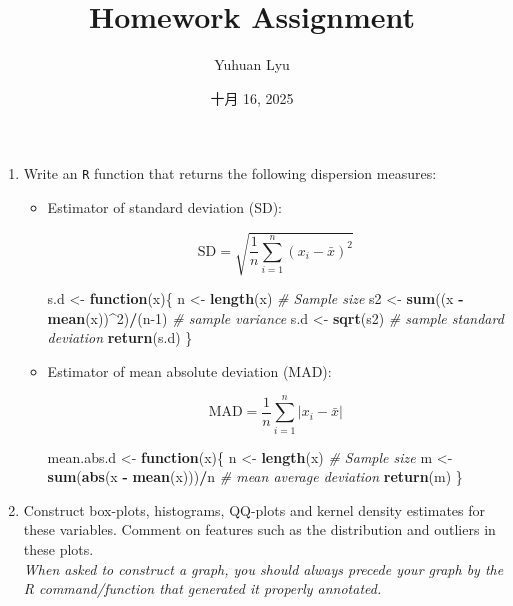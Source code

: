 \documentclass[
]{article}
\title{Homework Assignment}
\author{Yuhuan Lyu}
\date{十月 16, 2025}
\newenvironment{Shaded}{\begin{snugshade}}{\end{snugshade}}
\newcommand{\CommentTok}[1]{\textcolor[rgb]{0.56,0.35,0.01}{\textit{#1}}}
\newcommand{\ControlFlowTok}[1]{\textcolor[rgb]{0.13,0.29,0.53}{\textbf{#1}}}
\newcommand{\DecValTok}[1]{\textcolor[rgb]{0.00,0.00,0.81}{#1}}
\newcommand{\FunctionTok}[1]{\textcolor[rgb]{0.13,0.29,0.53}{\textbf{#1}}}
\newcommand{\NormalTok}[1]{#1}
\newcommand{\OtherTok}[1]{\textcolor[rgb]{0.56,0.35,0.01}{#1}}
\newcommand{\SpecialCharTok}[1]{\textcolor[rgb]{0.81,0.36,0.00}{\textbf{#1}}}
\begin{document}
\maketitle

\begin{enumerate}
\def\labelenumi{\arabic{enumi}.}
\item
  Write an \texttt{R} function that returns the following dispersion
  measures:

  \begin{itemize}
  \item
    Estimator of standard deviation (SD):

    \[\text{SD} = \sqrt{\frac{1}{n}\sum_{i=1}^{n}(x_{i} - \bar{x})^2}\]

\begin{Shaded}
\begin{Highlighting}[]
\NormalTok{s.d }\OtherTok{\textless{}{-}} \ControlFlowTok{function}\NormalTok{(x)\{}
\NormalTok{    n }\OtherTok{\textless{}{-}} \FunctionTok{length}\NormalTok{(x) }\CommentTok{\# Sample size}
\NormalTok{    s2 }\OtherTok{\textless{}{-}} \FunctionTok{sum}\NormalTok{((x }\SpecialCharTok{{-}} \FunctionTok{mean}\NormalTok{(x))}\SpecialCharTok{\^{}}\DecValTok{2}\NormalTok{)}\SpecialCharTok{/}\NormalTok{(n}\DecValTok{{-}1}\NormalTok{) }\CommentTok{\# sample variance}
\NormalTok{    s.d }\OtherTok{\textless{}{-}} \FunctionTok{sqrt}\NormalTok{(s2) }\CommentTok{\# sample standard deviation }
    \FunctionTok{return}\NormalTok{(s.d)}
\NormalTok{\}}
\end{Highlighting}
\end{Shaded}
  \item
    Estimator of mean absolute deviation (MAD):

    \[\text{MAD} = \frac{1}{n}\sum_{i=1}^{n}|x_{i} - \bar{x}|\]

\begin{Shaded}
\begin{Highlighting}[]
\NormalTok{mean.abs.d }\OtherTok{\textless{}{-}} \ControlFlowTok{function}\NormalTok{(x)\{}
\NormalTok{    n }\OtherTok{\textless{}{-}} \FunctionTok{length}\NormalTok{(x) }\CommentTok{\# Sample size}
\NormalTok{    m }\OtherTok{\textless{}{-}} \FunctionTok{sum}\NormalTok{(}\FunctionTok{abs}\NormalTok{(x }\SpecialCharTok{{-}} \FunctionTok{mean}\NormalTok{(x)))}\SpecialCharTok{/}\NormalTok{n }\CommentTok{\# mean average deviation}
    \FunctionTok{return}\NormalTok{(m)}
\NormalTok{\}}
\end{Highlighting}
\end{Shaded}
  \end{itemize}
\item
  Construct box-plots, histograms, QQ-plots and kernel density estimates
  for these variables. Comment on features such as the distribution and
  outliers in these plots.\\
  \emph{When asked to construct a graph, you should always precede your
  graph by the R command/function that generated it properly annotated.}


\end{enumerate}
\end{document}
